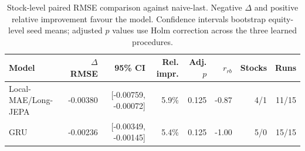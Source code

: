 \begin{table}[t]
\centering
\small
\caption{Stock-level paired RMSE comparison against naive-last. Negative $\Delta$ and positive relative improvement favour the model. Confidence intervals bootstrap equity-level seed means; adjusted $p$ values use Holm correction across the three learned procedures.}
\label{tab:paired_rmse_naive}
\begin{tabular}{lrrrrrrr}
\toprule
Model & $\Delta$RMSE & 95\% CI & Rel. impr. & Adj. $p$ & $r_{rb}$ & Stocks & Runs \\
\midrule
Local-MAE/Long-JEPA & -0.00380 & [-0.00759, -0.00072] & 5.9\% & 0.125 & -0.87 & 4/1 & 11/15 \\
GRU & -0.00236 & [-0.00349, -0.00145] & 5.4\% & 0.125 & -1.00 & 5/0 & 15/15 \\
\bottomrule
\end{tabular}
\end{table}

